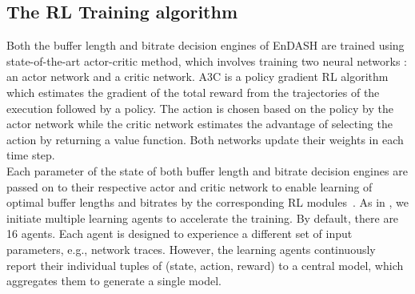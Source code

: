  \subsection{The \ac{RL} Training algorithm}
 Both the buffer length and bitrate decision engines of EnDASH are trained using  state-of-the-art actor-critic method, which involves training two neural networks \cite{mao2017neural}: an actor network and a critic network. A3C is a policy gradient \ac{RL} algorithm which estimates the gradient of the total reward from the trajectories of the execution followed by a policy. The action is chosen based on the policy by the actor network while the critic network estimates the advantage of selecting the action by returning a value function. Both networks update their weights in each time step. \\
 \indent Each parameter of the state  of both buffer length and bitrate decision engines are passed on to their respective actor and critic network to enable learning of optimal buffer lengths and bitrates by the corresponding \ac{RL} modules~\cite{mao2017neural}.
 As in \cite{mao2017neural}, we initiate multiple learning agents to accelerate the training. By default, there are 16 agents. Each agent is designed to experience a different set of input parameters, e.g., network traces. However, the learning agents continuously report  their individual tuples of (state, action, reward)  to a central model, which aggregates them to generate a single model.
